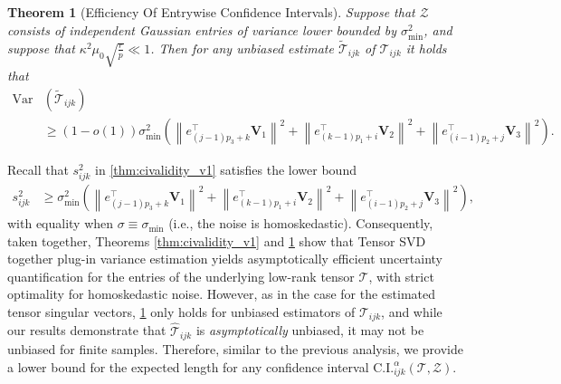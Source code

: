 \documentclass[10pt]{article}
\newcommand{\0}{{\mathbf{0}}}
\newcommand{\1}{{\mathbf{1}}}
\renewcommand{\t}{^{\top}}
\newtheorem{theorem}{Theorem}
\renewcommand{\tilde}{\widetilde}
\renewcommand{\hat}{\widehat}
\renewcommand{\hat}{\widehat}
\newcommand{\red}{\color{red}}
\begin{document}
\begin{theorem}[Efficiency Of Entrywise Confidence Intervals] \label{thm:efficiency}
Suppose that $\mathcal{Z}$ consists of independent Gaussian entries of variance lower bounded by $\sigma_{\min}^2$, and suppose that $\kappa^2 \mu_0 \sqrt{\frac{r}{p}} \ll 1$. Then for any unbiased estimate $\mathcal{\tilde T}_{ijk}$ of $\mathcal{T}_{ijk}$ it holds that
\begin{align*}
    \mathrm{Var}&(\mathcal{\tilde T}_{ijk}) \\
    &\geq (1 - o(1)) 
\sigma^2_{\min}  \left(\left\|e_{(j-1) p_{3}+k}^{\top} \mathbf{V}_{1}\right\|^{2}+\left\|e_{(k-1) p_{1}+i}\t \mathbf{V}_{2}\right\|^{2}+\left\|e_{(i-1) p_{2}+j}\t \mathbf{V}_{3}\right\|^{2}\right).
\end{align*}
\end{theorem}

Recall that $s^2_{ijk}$ in \cref{thm:civalidity_v1} satisfies the lower bound
\begin{align*}
    s^2_{ijk} &\geq \sigma^2_{\min}  \left(\left\|e_{(j-1) p_{3}+k}^{\top} \mathbf{V}_{1}\right\|^{2}+\left\|e_{(k-1) p_{1}+i}\t \mathbf{V}_{2}\right\|^{2}+\left\|e_{(i-1) p_{2}+j}\t \mathbf{V}_{3}\right\|^{2}\right),
\end{align*}
with equality when $\sigma \equiv \sigma_{\min}$ (i.e., the noise is homoskedastic). Consequently, taken together, Theorems \ref{thm:civalidity_v1} and \ref{thm:efficiency} show that Tensor SVD together plug-in variance estimation yields asymptotically efficient uncertainty quantification for the entries of the underlying low-rank tensor $\mathcal{T}$, with strict optimality for homoskedastic noise. However, as in the case for the estimated tensor singular vectors, \cref{thm:efficiency} only holds for unbiased estimators of $\mathcal{T}_{ijk}$, and while our results demonstrate that $\mathcal{\hat T}_{ijk}$ is \emph{asymptotically} unbiased, it may not be unbiased for finite samples.  Therefore, similar to the previous analysis, we provide a lower bound for the expected length for any confidence interval $\mathrm{C.I.}^{\alpha}_{ijk}(\mathcal{T},\mathcal{Z})$.
\end{document}
